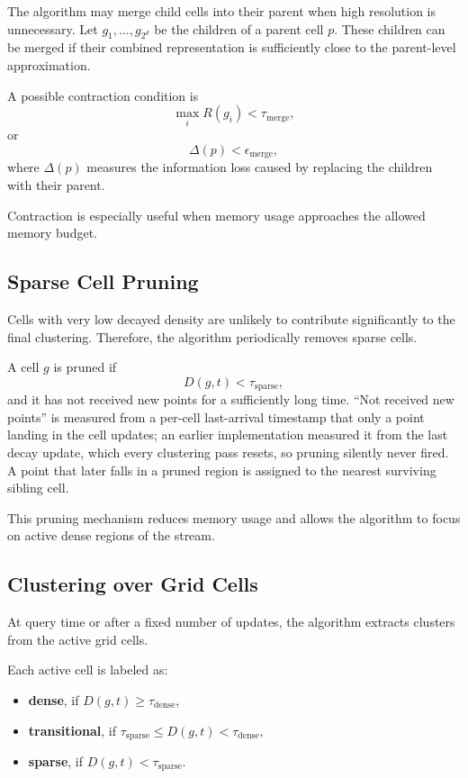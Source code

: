 \documentclass[11pt]{article}
\begin{document}
The algorithm may merge child cells into their parent when high resolution is unnecessary. Let $g_1,\ldots,g_{2^d}$ be the children of a parent cell $p$. These children can be merged if their combined representation is sufficiently close to the parent-level approximation.

A possible contraction condition is
\[
\max_i R(g_i) < \tau_{\text{merge}},
\]
or
\[
\Delta(p) < \epsilon_{\text{merge}},
\]
where $\Delta(p)$ measures the information loss caused by replacing the children with their parent.

Contraction is especially useful when memory usage approaches the allowed memory budget.

\subsection{Sparse Cell Pruning}

Cells with very low decayed density are unlikely to contribute significantly to the final clustering. Therefore, the algorithm periodically removes sparse cells.

A cell $g$ is pruned if
\[
D(g,t) < \tau_{\text{sparse}},
\]
and it has not received new points for a sufficiently long time. ``Not received new points'' is measured from a per-cell last-arrival timestamp that only a point landing in the cell updates; an earlier implementation measured it from the last decay update, which every clustering pass resets, so pruning silently never fired. A point that later falls in a pruned region is assigned to the nearest surviving sibling cell.

This pruning mechanism reduces memory usage and allows the algorithm to focus on active dense regions of the stream.

\subsection{Clustering over Grid Cells}

At query time or after a fixed number of updates, the algorithm extracts clusters from the active grid cells.

Each active cell is labeled as:

\begin{itemize}
    \item \textbf{dense}, if $D(g,t) \geq \tau_{\text{dense}}$,
    \item \textbf{transitional}, if $\tau_{\text{sparse}} \leq D(g,t) < \tau_{\text{dense}}$,
    \item \textbf{sparse}, if $D(g,t) < \tau_{\text{sparse}}$.
\end{itemize}
\end{document}
